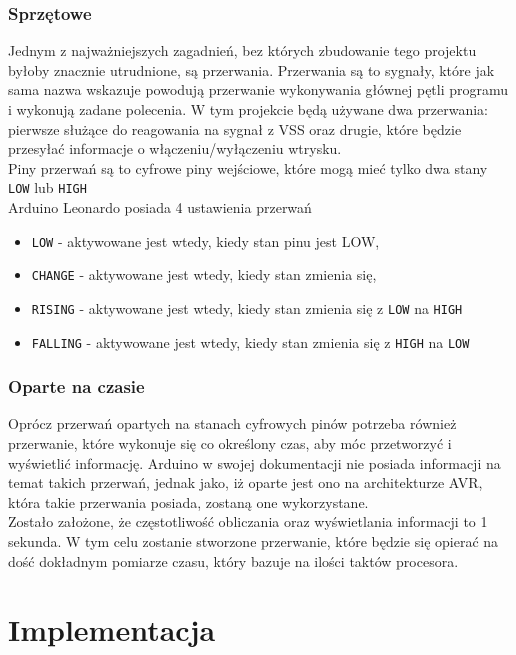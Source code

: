 \subsubsection{Sprzętowe}
Jednym z najważniejszych zagadnień, bez których zbudowanie tego projektu byłoby znacznie utrudnione, są przerwania. Przerwania są to sygnały, które jak sama nazwa wskazuje powodują przerwanie wykonywania głównej pętli programu i wykonują zadane polecenia. W tym projekcie będą używane dwa przerwania: pierwsze służące do reagowania na sygnał z VSS oraz drugie, które będzie przesyłać informacje o włączeniu/wyłączeniu wtrysku.\\

Piny przerwań są to cyfrowe piny wejściowe, które mogą mieć tylko dwa stany \texttt{LOW} lub \texttt{HIGH}\\

Arduino Leonardo posiada 4 ustawienia przerwań \cite{ard_ref}
\begin{itemize}
    \item \texttt{LOW} - aktywowane jest wtedy, kiedy stan pinu jest LOW,
    \item \texttt{CHANGE} - aktywowane jest wtedy, kiedy stan zmienia się,
    \item \texttt{RISING} - aktywowane jest wtedy, kiedy stan zmienia się z \texttt{LOW} na \texttt{HIGH} 
    \item \texttt{FALLING} - aktywowane jest wtedy, kiedy stan zmienia się z \texttt{HIGH} na \texttt{LOW} 
\end{itemize}

\subsubsection{Oparte na czasie}
Oprócz przerwań opartych na stanach cyfrowych pinów potrzeba również przerwanie, które wykonuje się co określony czas, aby móc przetworzyć i wyświetlić informację. Arduino w swojej dokumentacji nie posiada informacji na temat takich przerwań, jednak jako, iż oparte jest ono na architekturze AVR, która takie przerwania posiada, zostaną one wykorzystane.\\
Zostało założone, że częstotliwość obliczania oraz wyświetlania informacji to 1 sekunda. W tym celu zostanie stworzone przerwanie, które będzie się opierać na dość dokładnym pomiarze czasu, który bazuje na ilości taktów procesora.\\

\section{Implementacja}
